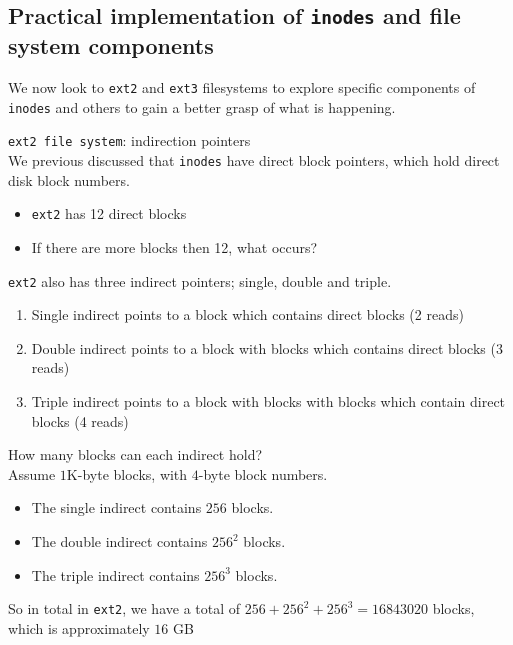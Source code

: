 \documentclass[journal, letterpaper]{IEEEtran}
\begin{document}
\subsection{Practical implementation of \texttt{inodes} and file system components}
We now look to \verb|ext2| and \verb|ext3| filesystems to explore specific components of \verb|inodes| and others to gain a better grasp of what is happening.
\begin{theory}{\texttt{ext2 file system}: indirection pointers} \\
    We previous discussed that \verb|inodes| have direct block pointers, which hold direct disk block numbers. 
    \begin{itemize}
        \item \verb|ext2| has 12 direct blocks
        \item If there are more blocks then 12, what occurs?
    \end{itemize}
    \verb|ext2| also has three indirect pointers; single, double and triple.
    \begin{enumerate}
        \item Single indirect points to a block which contains direct blocks (2 reads)
        \item Double indirect points to a block with blocks which contains direct blocks (3 reads)
        \item Triple indirect points to a block with blocks with blocks which contain direct blocks (4 reads)
    \end{enumerate}
\end{theory}
\begin{aside}{How many blocks can each indirect hold?} \\
    Assume $1$K-byte blocks, with $4$-byte block numbers.
    \begin{itemize}
        \item The single indirect contains $256$ blocks.
        \item The double indirect contains $256^2$ blocks.
        \item The triple indirect contains $256^3$ blocks.
    \end{itemize}
    So in total in \texttt{ext2}, we have a total of $256 + 256^2 + 256^3 = 16843020$ blocks, which is approximately $16$ GB
\end{aside}
\end{document}
